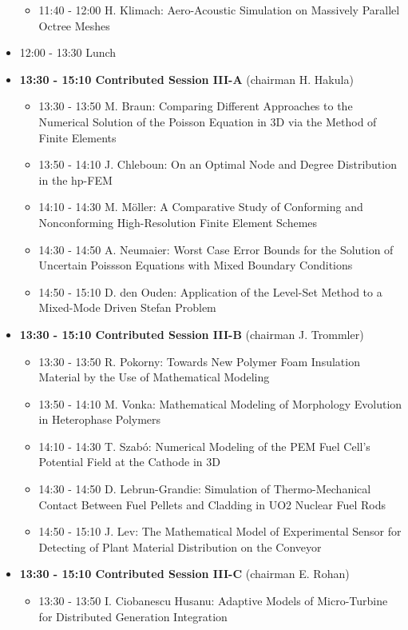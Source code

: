 \documentclass[10pt, A4]{article}%
\begin{document}
\begin{itemize}
\begin{itemize}
    \item 11:40 - 12:00 H. Klimach: Aero-Acoustic Simulation on Massively Parallel Octree Meshes
  \end{itemize}
  \item 12:00 - 13:30 Lunch
  \item {\bf 13:30 - 15:10 Contributed Session III-A} (chairman H. Hakula) 
  \begin{itemize}
    \item 13:30 - 13:50 M. Braun: Comparing Different Approaches to the Numerical Solution of the Poisson Equation in 3D via the Method of Finite Elements
    \item 13:50 - 14:10 J. Chleboun: On an Optimal Node and Degree Distribution in the hp-FEM
    \item 14:10 - 14:30 M. M\"{o}ller: A Comparative Study of Conforming and Nonconforming High-Resolution Finite Element Schemes
    \item 14:30 - 14:50 A. Neumaier: Worst Case Error Bounds for the Solution of Uncertain Poissson Equations with Mixed Boundary Conditions
    \item 14:50 - 15:10 D. den Ouden: Application of the Level-Set Method to a Mixed-Mode Driven Stefan Problem
  \end{itemize}
  \item {\bf 13:30 - 15:10 Contributed Session III-B} (chairman J. Trommler) 
  \begin{itemize}
    \item 13:30 - 13:50 R. Pokorny: Towards New Polymer Foam Insulation Material by the Use of Mathematical Modeling
    \item 13:50 - 14:10 M. Vonka: Mathematical Modeling of Morphology Evolution in Heterophase Polymers
    \item 14:10 - 14:30 T. Szab\'{o}: Numerical Modeling of the PEM Fuel Cell’s Potential Field at the Cathode in 3D
    \item 14:30 - 14:50 D. Lebrun-Grandie: Simulation of Thermo-Mechanical Contact Between Fuel Pellets and Cladding in UO2 Nuclear Fuel Rods
    \item 14:50 - 15:10 J. Lev: The Mathematical Model of Experimental Sensor for Detecting of Plant Material Distribution on the Conveyor
  \end{itemize}
    \item {\bf 13:30 - 15:10 Contributed Session III-C} (chairman E. Rohan) 
  \begin{itemize}
    \item 13:30 - 13:50 I. Ciobanescu Husanu: Adaptive Models of Micro-Turbine for Distributed Generation Integration 

\end{itemize}
\end{itemize}
\end{document}
